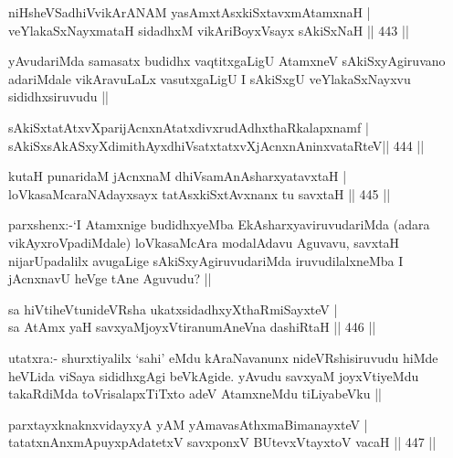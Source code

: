 \begin{shl}
niHsheVSadhiVvikArANAM yasAmxtAsxkiSxtavxmAtamxnaH | \\
veYlakaSxNayxmataH sidadhxM vikAriBoyxV\s sayx sAkiSxNaH \hfill||  443 || 
\end{shl}

\begin{artha}
yAvudariMda samasatx budidhx vaqtitxgaLigU AtamxneV sAkiSxyAgiruvano adariMdale vikAravuLaLx vasutxgaLigU I sAkiSxgU veYlakaSxNayxvu sididhxsiruvudu ||
\end{artha}


\begin{shl}
sAkiSxtatAtxvXparijAcnxnAtatxdivxrudAdhxthaRkalapxnamf | \\
sAkiSxsAkASxyXdimithAyxdhiVsatxtatxvXjAcnxnAninxvataRteV\hfill ||  444 || 
\end{shl}

\begin{shl}
kutaH punaridaM jAcnxnaM dhiVsamAnAsharxyatavxtaH | \\
loVkasaMcaraNAdayxsayx tatAsxkiSxtAvxnanx tu savxtaH \hfill||  445 ||  
\end{shl}

\begin{artha}
parxshenx:-`I Atamxnige budidhxyeMba EkAsharxyaviruvudariMda (adara vikAyxroVpadiMdale) loVkasaMcAra modalAdavu Aguvavu, savxtaH nijarUpadalilx avugaLige sAkiSxyAgiruvudariMda iruvudilalxneMba I jAcnxnavU heVge tAne Aguvudu? ||
\end{artha}

\begin{shl}
sa hiVtiheVtunideVRsha ukatxsidadhxyXthaRmiSayxteV | \\
sa AtAmx yaH savxyaMjoyxVtiranumAneVna dashiRtaH \hfill||  446 ||  
\end{shl}

\begin{artha}
utatxra:- shurxtiyalilx `sahi' eMdu kAraNavanunx nideVRshisiruvudu hiMde heVLida viSaya sididhxgAgi beVkAgide. yAvudu savxyaM joyxVtiyeMdu takaRdiMda toVrisalapxTiTxto adeV AtamxneMdu tiLiyabeVku ||
\end{artha}


\begin{shl}
parxtayxknaknxvidayxyA yAM yAmavasAthxmaBimanayxteV | \\
tatatxnAnxmApuyxpAdatetxV savxponxV BUtevxVtayxtoV vacaH \hfill||  447 ||  
\end{shl}

